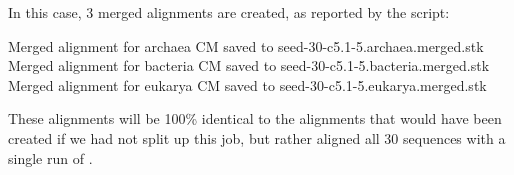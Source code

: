 In this case, 3 merged alignments are created, as reported by the
script:

\begin{sreoutput}
Merged alignment for archaea  CM saved to seed-30-c5.1-5.archaea.merged.stk
Merged alignment for bacteria CM saved to seed-30-c5.1-5.bacteria.merged.stk
Merged alignment for eukarya  CM saved to seed-30-c5.1-5.eukarya.merged.stk
\end{sreoutput}

These alignments will be 100\% identical to the alignments that would
have been created if we had not split up this job, but rather aligned
all 30 sequences with a single run of .

